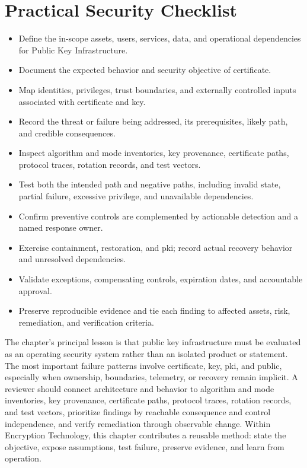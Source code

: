 \documentclass[11pt]{article}
\begin{document}
\section*{Practical Security Checklist}
\begin{itemize}[label=$\square$]
\item Define the in-scope assets, users, services, data, and operational dependencies for Public Key Infrastructure.
\item Document the expected behavior and security objective of certificate.
\item Map identities, privileges, trust boundaries, and externally controlled inputs associated with certificate and key.
\item Record the threat or failure being addressed, its prerequisites, likely path, and credible consequences.
\item Inspect algorithm and mode inventories, key provenance, certificate paths, protocol traces, rotation records, and test vectors.
\item Test both the intended path and negative paths, including invalid state, partial failure, excessive privilege, and unavailable dependencies.
\item Confirm preventive controls are complemented by actionable detection and a named response owner.
\item Exercise containment, restoration, and pki; record actual recovery behavior and unresolved dependencies.
\item Validate exceptions, compensating controls, expiration dates, and accountable approval.
\item Preserve reproducible evidence and tie each finding to affected assets, risk, remediation, and verification criteria.
\end{itemize}
\begin{synthesisbox}
The chapter's principal lesson is that public key infrastructure must be evaluated as an operating security system rather than an isolated product or statement. The most important failure patterns involve certificate, key, pki, and public, especially when ownership, boundaries, telemetry, or recovery remain implicit. A reviewer should connect architecture and behavior to algorithm and mode inventories, key provenance, certificate paths, protocol traces, rotation records, and test vectors, prioritize findings by reachable consequence and control independence, and verify remediation through observable change. Within Encryption Technology, this chapter contributes a reusable method: state the objective, expose assumptions, test failure, preserve evidence, and learn from operation.
\end{synthesisbox}
\end{document}
